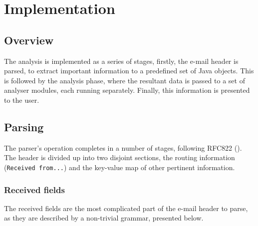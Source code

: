 \chapter{Implementation}\label{chap:imp}
\section{Overview}
The  analysis is implemented as a series of stages, firstly, the e-mail header is parsed, to extract important information to a predefined set of Java objects.  This is followed by the analysis phase, where the resultant data is passed to a set of analyser modules, each running separately.  Finally, this information is presented to the user.

\section{Parsing}
The parser's operation completes in a number of stages, following RFC822 (\cite{RFC0822}).  The header is divided up into two disjoint sections, the routing information (\texttt{Received from...}) and the key-value map of other pertinent information.
\subsection{Received fields}
The received fields are the most complicated part of the e-mail header to parse, as they are described by a non-trivial grammar, presented below.

